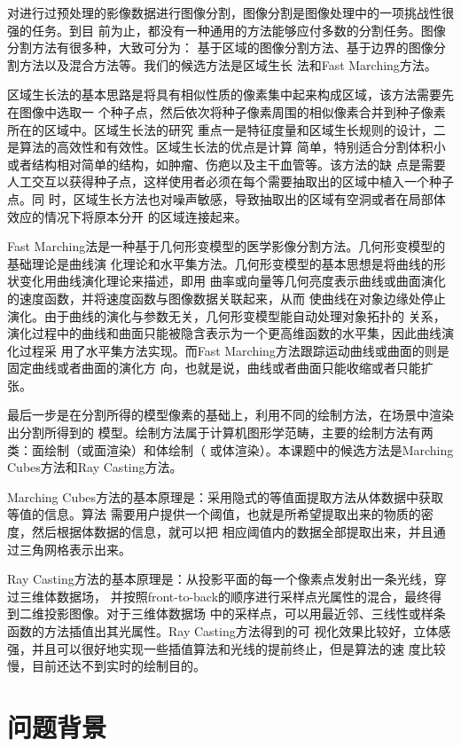 对进行过预处理的影像数据进行图像分割，图像分割是图像处理中的一项挑战性很强的任务。到目
前为止，都没有一种通用的方法能够应付多数的分割任务。图像分割方法有很多种，大致可分为：
基于区域的图像分割方法、基于边界的图像分割方法以及混合方法等。我们的候选方法是区域生长
法和Fast Marching方法。

区域生长法的基本思路是将具有相似性质的像素集中起来构成区域，该方法需要先在图像中选取一
个种子点，然后依次将种子像素周围的相似像素合并到种子像素所在的区域中。区域生长法的研究
重点一是特征度量和区域生长规则的设计，二是算法的高效性和有效性。区域生长法的优点是计算
简单，特别适合分割体积小或者结构相对简单的结构，如肿瘤、伤疤以及主干血管等。该方法的缺
点是需要人工交互以获得种子点，这样使用者必须在每个需要抽取出的区域中植入一个种子点。同
时，区域生长方法也对噪声敏感，导致抽取出的区域有空洞或者在局部体效应的情况下将原本分开
的区域连接起来。

Fast Marching法是一种基于几何形变模型的医学影像分割方法。几何形变模型的基础理论是曲线演
化理论和水平集方法。几何形变模型的基本思想是将曲线的形状变化用曲线演化理论来描述，即用
曲率或向量等几何亮度表示曲线或曲面演化的速度函数，并将速度函数与图像数据关联起来，从而
使曲线在对象边缘处停止演化。由于曲线的演化与参数无关，几何形变模型能自动处理对象拓扑的
关系，演化过程中的曲线和曲面只能被隐含表示为一个更高维函数的水平集，因此曲线演化过程采
用了水平集方法实现。而Fast Marching方法跟踪运动曲线或曲面的则是固定曲线或者曲面的演化方
向，也就是说，曲线或者曲面只能收缩或者只能扩张。

最后一步是在分割所得的模型像素的基础上，利用不同的绘制方法，在场景中渲染出分割所得到的
模型。绘制方法属于计算机图形学范畴，主要的绘制方法有两类：面绘制（或面渲染）和体绘制（
或体渲染）。本课题中的候选方法是Marching Cubes方法和Ray Casting方法。

Marching Cubes方法的基本原理是：采用隐式的等值面提取方法从体数据中获取等值的信息。算法
需要用户提供一个阈值，也就是所希望提取出来的物质的密度，然后根据体数据的信息，就可以把
相应阈值内的数据全部提取出来，并且通过三角网格表示出来。

Ray Casting方法的基本原理是：从投影平面的每一个像素点发射出一条光线，穿过三维体数据场，
并按照front-to-back的顺序进行采样点光属性的混合，最终得到二维投影图像。对于三维体数据场
中的采样点，可以用最近邻、三线性或样条函数的方法插值出其光属性。Ray Casting方法得到的可
视化效果比较好，立体感强，并且可以很好地实现一些插值算法和光线的提前终止，但是算法的速
度比较慢，目前还达不到实时的绘制目的。

\section{问题背景}

